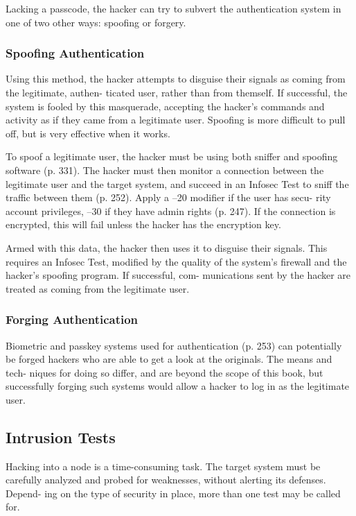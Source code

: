 Lacking a passcode, the hacker can try to subvert 
the authentication system in one of two other ways: 
spoofing or forgery.

\subsubsection{Spoofing Authentication}

Using this method, the hacker attempts to disguise 
their signals as coming from the legitimate, authen-
ticated user, rather than from themself. If successful, 
the system is fooled by this masquerade, accepting the 
hacker's commands and activity as if they came from 
a legitimate user. Spoofing is more difficult to pull off, 
but is very effective when it works.

To spoof a legitimate user, the hacker must be using 
both sniffer and spoofing software (p. 331). The 
hacker must then monitor a connection between the 
legitimate user and the target system, and succeed 
in an Infosec Test to sniff the traffic between them 
(p. 252). Apply a –20 modifier if the user has secu-
rity account privileges, –30 if they have admin rights 
(p. 247). If the connection is encrypted, this will fail 
unless the hacker has the encryption key.

Armed with this data, the hacker then uses it to 
disguise their signals. This requires an Infosec Test, 
modified by the quality of the system's firewall and 
the hacker's spoofing program. If successful, com-
munications sent by the hacker are treated as coming 
from the legitimate user.

\subsubsection{Forging Authentication}

Biometric and passkey systems used for authentication 
(p. 253) can potentially be forged hackers who are 
able to get a look at the originals. The means and tech-
niques for doing so differ, and are beyond the scope of 
this book, but successfully forging such systems would 
allow a hacker to log in as the legitimate user.

\subsection{Intrusion Tests}

Hacking into a node is a time-consuming task. The 
target system must be carefully analyzed and probed 
for weaknesses, without alerting its defenses. Depend-
ing on the type of security in place, more than one test 
may be called for.

